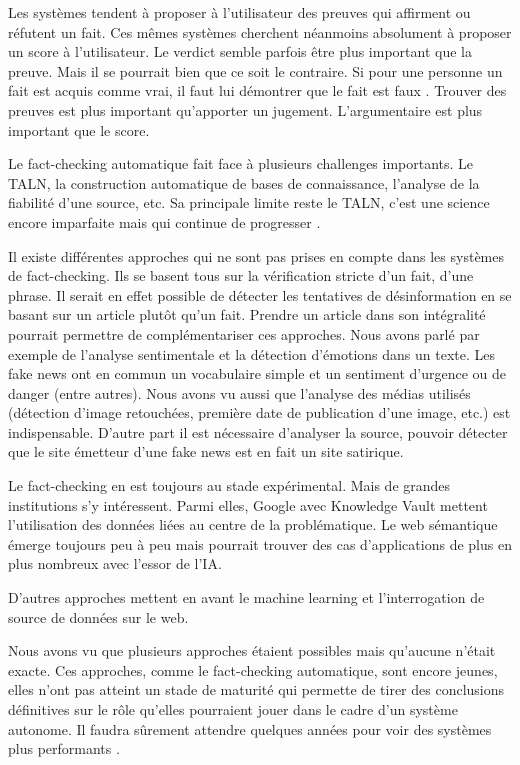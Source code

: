 Les systèmes tendent à proposer à l'utilisateur des preuves qui affirment ou réfutent un fait. Ces mêmes systèmes cherchent néanmoins absolument à proposer un score à l'utilisateur. Le verdict semble parfois être plus important que la preuve. Mais il se pourrait bien que ce soit le contraire. Si pour une personne un fait est acquis comme vrai, il faut lui démontrer que le fait est faux \cite{cobb2013beliefs}. Trouver des preuves est plus important qu'apporter un jugement. L'argumentaire est plus important que le score.

Le fact-checking automatique fait face à plusieurs challenges importants. Le TALN, la construction automatique de bases de connaissance, l'analyse de la fiabilité d'une source, etc. Sa principale limite reste le TALN, c'est une science encore imparfaite mais qui continue de progresser \cite{jozefowicz2016exploring}.

Il existe différentes approches qui ne sont pas prises en compte dans les systèmes de fact-checking. Ils se basent tous sur la vérification stricte d'un fait, d'une phrase. Il serait en effet possible de détecter les tentatives de désinformation en se basant sur un article plutôt qu'un fait. Prendre un article dans son intégralité pourrait permettre de complémentariser ces approches. Nous avons parlé par exemple de l'analyse sentimentale et la détection d'émotions dans un texte. Les fake news ont en commun un vocabulaire simple et un sentiment d'urgence ou de danger (entre autres). Nous avons vu aussi que l'analyse des médias utilisés (détection d'image retouchées, première date de publication d'une image, etc.) est indispensable. D'autre part il est nécessaire d'analyser la source, pouvoir détecter que le site émetteur d'une fake news est en fait un site satirique.

Le fact-checking en est toujours au stade expérimental. Mais de grandes institutions s'y intéressent. Parmi elles, Google avec Knowledge Vault mettent l'utilisation des données liées au centre de la problématique. Le web sémantique émerge toujours peu à peu mais pourrait trouver des cas d'applications de plus en plus nombreux avec l'essor de l'IA.

D'autres approches mettent en avant le machine learning et l'interrogation de source de données sur le web.

Nous avons vu que plusieurs approches étaient possibles mais qu'aucune n'était exacte. Ces approches, comme le fact-checking automatique, sont encore jeunes, elles n'ont pas atteint un stade de maturité qui permette de tirer des conclusions définitives sur le rôle qu'elles pourraient jouer dans le cadre d'un système autonome. Il faudra sûrement attendre quelques années pour voir des systèmes plus performants \cite{gravesfactsheet}.

